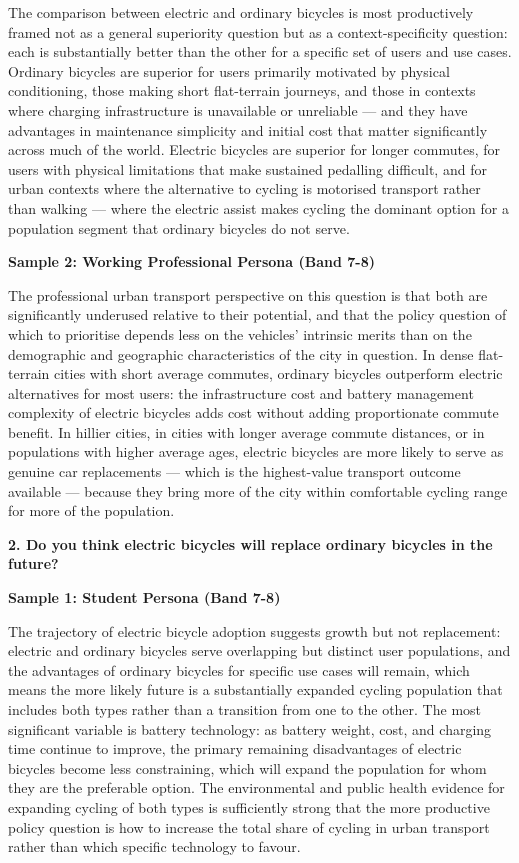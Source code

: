 The comparison between electric and ordinary bicycles is most productively framed not as a general superiority question but as a context-specificity question: each is substantially better than the other for a specific set of users and use cases. Ordinary bicycles are superior for users primarily motivated by physical conditioning, those making short flat-terrain journeys, and those in contexts where charging infrastructure is unavailable or unreliable — and they have advantages in maintenance simplicity and initial cost that matter significantly across much of the world. Electric bicycles are superior for longer commutes, for users with physical limitations that make sustained pedalling difficult, and for urban contexts where the alternative to cycling is motorised transport rather than walking — where the electric assist makes cycling the dominant option for a population segment that ordinary bicycles do not serve.

\textbf{Sample 2: Working Professional Persona (Band 7-8)}

The professional urban transport perspective on this question is that both are significantly underused relative to their potential, and that the policy question of which to prioritise depends less on the vehicles' intrinsic merits than on the demographic and geographic characteristics of the city in question. In dense flat-terrain cities with short average commutes, ordinary bicycles outperform electric alternatives for most users: the infrastructure cost and battery management complexity of electric bicycles adds cost without adding proportionate commute benefit. In hillier cities, in cities with longer average commute distances, or in populations with higher average ages, electric bicycles are more likely to serve as genuine car replacements — which is the highest-value transport outcome available — because they bring more of the city within comfortable cycling range for more of the population.

\separator

\begin{ieltsquestion}
\textbf{2. Do you think electric bicycles will replace ordinary bicycles in the future?}
\end{ieltsquestion}
\textbf{Sample 1: Student Persona (Band 7-8)}

The trajectory of electric bicycle adoption suggests growth but not replacement: electric and ordinary bicycles serve overlapping but distinct user populations, and the advantages of ordinary bicycles for specific use cases will remain, which means the more likely future is a substantially expanded cycling population that includes both types rather than a transition from one to the other. The most significant variable is battery technology: as battery weight, cost, and charging time continue to improve, the primary remaining disadvantages of electric bicycles become less constraining, which will expand the population for whom they are the preferable option. The environmental and public health evidence for expanding cycling of both types is sufficiently strong that the more productive policy question is how to increase the total share of cycling in urban transport rather than which specific technology to favour.

